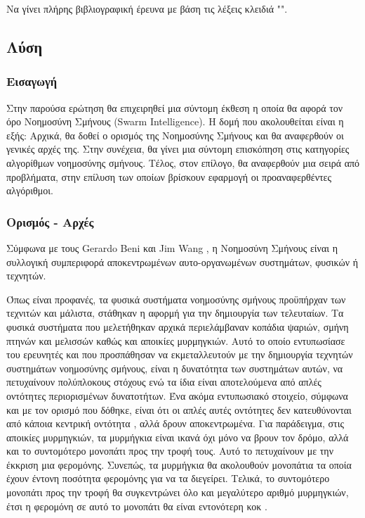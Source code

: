 \documentclass{assignment}
\begin{document}
Να γίνει πλήρης βιβλιογραφική έρευνα με βάση τις λέξεις κλειδιά "".

\subsection {Λύση}
\subsubsection{Εισαγωγή}
Στην παρούσα ερώτηση θα επιχειρηθεί μια σύντομη έκθεση η οποία θα αφορά τον όρο
Νοημοσύνη Σμήνους (Swarm Intelligence). Η δομή που ακολουθείται είναι η
εξής: Αρχικά, θα δοθεί ο ορισμός της Νοημοσύνης Σμήνους και θα αναφερθούν οι
γενικές αρχές της. Στην συνέχεια, θα γίνει μια σύντομη επισκόπηση στις
κατηγορίες αλγορίθμων νοημοσύνης σμήνους. Τέλος, στον επίλογο, θα αναφερθούν
μια σειρά από προβλήματα, στην επίλυση των οποίων βρίσκουν εφαρμογή οι
προαναφερθέντες αλγόριθμοι.
\subsubsection{Ορισμός - Αρχές}
Σύμφωνα με τους Gerardo Beni και Jim Wang \cite{beni1993swarm}, η Νοημοσύνη
Σμήνους είναι η συλλογική συμπεριφορά αποκεντρωμένων αυτο-οργανωμένων
συστημάτων, φυσικών ή τεχνητών.

Όπως είναι προφανές, τα φυσικά συστήματα νοημοσύνης σμήνους προϋπήρχαν των
τεχνιτών και μάλιστα, στάθηκαν η αφορμή για την δημιουργία των τελευταίων. Τα
φυσικά συστήματα που μελετήθηκαν αρχικά περιελάμβαναν κοπάδια ψαριών, σμήνη
πτηνών και μελισσών καθώς και αποικίες μυρμηγκιών. Αυτό το οποίο εντυπωσίασε
του ερευνητές και που προσπάθησαν να εκμεταλλευτούν με την δημιουργία τεχνητών
συστημάτων νοημοσύνης σμήνους, είναι η δυνατότητα των συστημάτων αυτών, να
πετυχαίνουν πολύπλοκους στόχους ενώ τα ίδια είναι αποτελούμενα από απλές
οντότητες περιορισμένων δυνατοτήτων. Ένα ακόμα εντυπωσιακό στοιχείο, σύμφωνα
και με τον ορισμό που δόθηκε, είναι ότι οι απλές αυτές οντότητες δεν
κατευθύνονται από κάποια κεντρική οντότητα \cite{ahmed2012swarm}, αλλά δρουν
αποκεντρωμένα. Για παράδειγμα, στις αποικίες μυρμηγκιών, τα μυρμήγκια είναι
ικανά όχι μόνο να βρουν τον δρόμο, αλλά και το συντομότερο μονοπάτι προς την
τροφή τους. Αυτό το πετυχαίνουν με την έκκριση μια φερομόνης. Συνεπώς, τα
μυρμήγκια θα ακολουθούν μονοπάτια τα οποία έχουν έντονη ποσότητα φερομόνης
για να τα διεγείρει. Τελικά, το συντομότερο μονοπάτι προς την τροφή θα
συγκεντρώνει όλο και μεγαλύτερο αριθμό μυρμηγκιών, έτσι η φερομόνη σε αυτό το
μονοπάτι θα είναι εντονότερη κοκ \cite{dorigo2006ant}.
\end{document}
